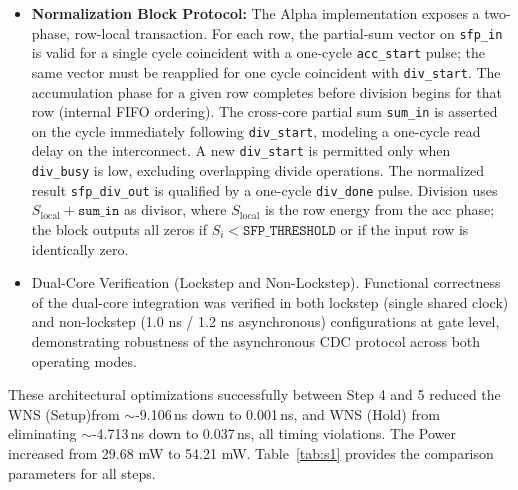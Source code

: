 \documentclass[journal]{IEEEtran}
\begin{document}
\begin{itemize}
    \textbf{Example Flow (MULT+NORM+READ):} 
    Write Q/K via \texttt{inst\_ext} $\rightarrow$ set \texttt{mode} $\rightarrow$ assert \texttt{start} (locks memory) $\rightarrow$ compute $\rightarrow$ unlock $\rightarrow$ read PMEM.
    The above example involves external memory instructions and mode configuration. Refer to Figure~\ref{fig:s5_Controller_user_manual_spec} for details.
    
    \textbf{Design Insights.}
    \begin{itemize}
        \item Flexible data loading; fixed execution schedule, simplifying hardware control while preserving user flexibility.
        \item Deterministic memory locking with hardware-enforced protection, eliminating user-side synchronization.
        \item Unified interface (4 commands) with mode-driven dataflow, reducing control complexity and enabling data reuse.
        \item Implicit pipeline support, allowing overlap of computation and data loading for higher throughput.
    \end{itemize}

    \item \textbf{Normalization Block Protocol: }
The Alpha implementation exposes a two-phase, row-local transaction. For each row, the partial-sum vector on \texttt{sfp\_in} is valid for a single cycle coincident with a one-cycle \texttt{acc\_start} pulse; the same vector must be reapplied for one cycle coincident with \texttt{div\_start}. The accumulation phase for a given row completes before division begins for that row (internal FIFO ordering). The cross-core partial sum \texttt{sum\_in} is asserted on the cycle immediately following \texttt{div\_start}, modeling a one-cycle read delay on the interconnect. A new \texttt{div\_start} is permitted only when \texttt{div\_busy} is low, excluding overlapping divide operations. The normalized result \texttt{sfp\_div\_out} is qualified by a one-cycle \texttt{div\_done} pulse. Division uses $S_{\mathrm{local}}+\texttt{sum\_in}$ as divisor, where $S_{\mathrm{local}}$ is the row energy from the acc phase; the block outputs all zeros if $S_i < \texttt{SFP\_THRESHOLD}$ or if the input row is identically zero.


\item Dual-Core Verification (Lockstep and Non-Lockstep). Functional correctness of the dual-core integration was verified in both lockstep (single shared clock) and non-lockstep (1.0 ns / 1.2 ns asynchronous) configurations at gate level, demonstrating robustness of the asynchronous CDC protocol across both operating modes.
    

\end{itemize}
These architectural optimizations successfully between Step 4 and 5 reduced the WNS (Setup)from $\sim$-9.106\,ns down to 0.001\,ns, and WNS (Hold) from eliminating $\sim$-4.713\,ns down to 0.037\,ns, all timing violations. The Power increased from 29.68 mW to 54.21 mW. Table~\ref{tab:s1} provides the comparison parameters for all steps.
\end{document}
